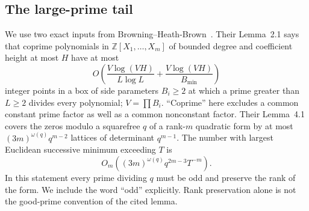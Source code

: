 \subsection{The large-prime tail}\label{subsec:v5-large-sieve}

We use two exact inputs from Browning--Heath-Brown~\cite{v5bhb}.
Their Lemma~2.1 says that coprime polynomials in $\mathbb Z[X_1,\ldots,X_m]$
of bounded degree and coefficient height at most $H$ have at most
\begin{equation}\label{eq:v5-box-sieve}
 O\left(\frac{V\log(VH)}{L\log L}
           +\frac{V\log(VH)}{B_{\min}}\right)
\end{equation}
integer points in a box of side parameters $B_i\geq2$ at which a prime
greater than $L\geq2$ divides every polynomial; $V=\prod B_i$.
``Coprime'' here excludes a common constant prime factor as well as a
common nonconstant factor. Their Lemma~4.1 covers the zeros modulo a
squarefree $q$ of a rank-$m$ quadratic form by at most
$(3m)^{\omega(q)}q^{m-2}$ lattices of determinant $q^{m-1}$.
The number with largest Euclidean successive minimum exceeding $T$ is
\begin{equation}\label{eq:v5-lattice-tail}
 O_m((3m)^{\omega(q)}q^{2m-3}T^{-m}).
\end{equation}
In this statement every prime dividing $q$ must be odd and preserve the
rank of the form. We include the word ``odd'' explicitly. Rank preservation
alone is not the good-prime convention of the cited lemma.

